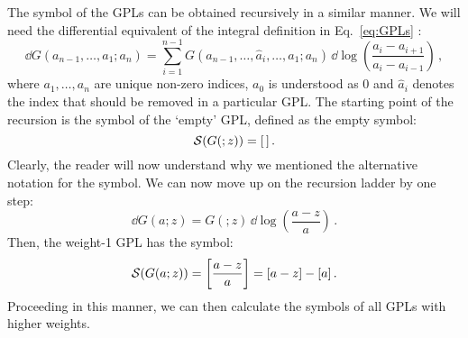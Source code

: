 \documentclass[main.tex]{subfiles}
\begin{document}
The symbol of the GPLs can be obtained recursively in a similar manner. We will need the differential equivalent of the integral definition in Eq.~\ref{eq:GPLs} \cite{2001math......3059G}:
\begin{equation} \label{eq:GPLdifferential}
    \dd G(a_{n-1}, \ldots, a_1; a_n) = \sum_{i=1}^{n-1} G(a_{n-1}, \ldots, \hat{a}_i, \ldots, a_1; a_n) \, \dd \log\left( \frac{a_i - a_{i+1}}{a_i - a_{i-1}} \right)\,,
\end{equation}
where $a_1, \ldots, a_n$ are unique non-zero indices, $a_0$ is understood as 0 and $\hat{a}_i$ denotes the index that should be removed in a particular GPL. The starting point of the recursion is the symbol of the `empty' GPL, defined as the empty symbol: 
\begin{equation}
    \mathcal{S} (G(;z)) = [\,]\,.
\end{equation}  
Clearly, the reader will now understand why we mentioned the alternative notation for the symbol. We can now move up on the recursion ladder by one step:
\begin{equation}
    \dd G(a; z) = G(;z) \, \dd \log \left(\frac{a-z}{a} \right)\,.
\end{equation}
Then, the weight-1 GPL has the symbol:
\begin{equation} \label{eq:G1symbol}
    \mathcal{S}(G(a; z)) = \left[\frac{a-z}{a} \right] = [a-z] - [a]\,.
\end{equation}
Proceeding in this manner, we can then calculate the symbols of all GPLs with higher weights.
\end{document}
